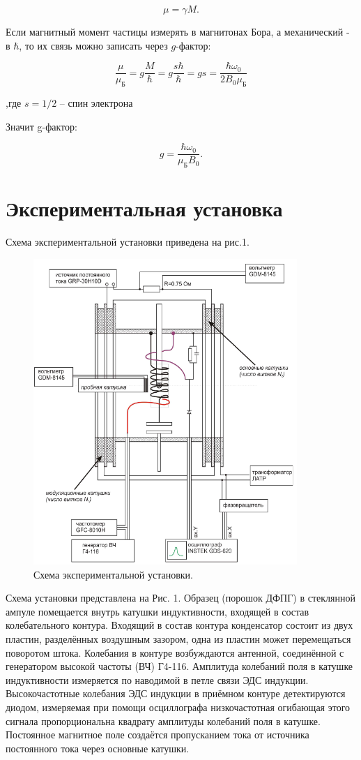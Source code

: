 \documentclass[12pt,a4paper]{article}
\begin{document}
\[ \mu = \gamma M.\]

Если магнитный момент частицы измерять в магнитонах Бора, а механический - в $\hbar$, то их связь можно записать через $g$-фактор:

 \[ \frac{\mu}{\mu_\text{Б}} = g \frac{M}{\hbar} = g \frac{s\hbar}{\hbar} = gs = \frac{\hbar \omega_0}{2 B_0 \mu_\text{Б}}\]

,где $s = 1/2$ -- спин электрона

Значит g-фактор:

\[	g = \frac{\hbar \omega_0}{\mu_\text{Б} B_0}.\]
 
\section*{Экспериментальная установка}
	
Схема экспериментальной установки приведена на рис.1.

\begin{figure}[H]
  \begin{center}
    \includegraphics[width=10cm]{res/scheme.png}
    \caption{Схема экспериментальной установки.}
    \label{fig:}
  \end{center}
\end{figure}
 
	
Схема установки представлена на Рис. 1. Образец (порошок ДФПГ) в стеклянной ампуле помещается внутрь катушки индуктивности, входящей в состав колебательного контура. Входящий в состав контура конденсатор состоит из двух пластин, разделённых воздушным зазором, одна из пластин может перемещаться поворотом штока. Колебания в контуре возбуждаются антенной, соединённой с генератором высокой частоты (ВЧ) Г4-116. Амплитуда колебаний поля в катушке индуктивности
измеряется по наводимой в петле связи ЭДС индукции. Высокочастотные колебания ЭДС
индукции в приёмном контуре детектируются диодом, измеряемая при помощи
осциллографа низкочастотная огибающая этого сигнала пропорциональна квадрату
амплитуды колебаний поля в катушке.\\
Постоянное магнитное поле создаётся пропусканием тока от источника постоянного тока через основные катушки. 
\end{document}
